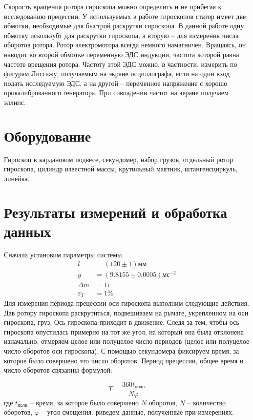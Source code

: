 \documentclass[a4paper, 12pt]{article}
\begin{document}
	Скорость вращения ротора гироскопа можно определить и не прибегая к исследованию прецессии. У используемых в работе гироскопов статор имеет две обмотки, необходимые для быстрой раскрутки гироскопа. В данной работе одну обмотку искользубт для раскрутки гироскопа, а вторую -- для измерения числа оборотов ротора. Ротор электромотора всегда немного намагничен. Вращаясь, он наводит во второй обмотке переменную ЭДС индукции, частота которой равна частоте врещения ротора. Частоту этой ЭДС можно, в частности, измерить по фигурам Лиссажу, получаемым на экране осциллографа, если на один вход подать исследуемую ЭДС, а на другой -- переменное напряжение с хорошо прокалиброванного генератора. При совпадении частот на эеране получаем эллипс.

    \section{Оборудование}

	Гироскоп в кардановом подвесе, секундомер, набор грузов, отдельный ротор гироскопа, цилиндр известной массы, крутильный маятник, штангенсциркуль, линейка.
    \section{Результаты измерений и обработка данных}
    
 Сначала установим параметры системы.
    \begin{align*}
     l&=(120\pm1)мм\\
     g&=(9.8155\pm0.0005)мс^{-2}\\
     \Delta m &= 1г\\
     \varepsilon_T &= 1\%
    \end{align*}
    Для измерения периода прецессии оси гироскопа выполним следующие действия. Дав ротору гироскопа раскрутиться, подвешиваем на рычаге, укрепленном на оси гироскопа, груз. Ось гироскопа приходит в движение. Следя за тем, чтобы ось гироскопа опустилась примерно на тот же угол, на который она была отклонена изначально, отмеряем целое или полуцелое число периодов (целое или полуцелое число оборотов оси гироскопа). С помощью секундомера фиксируем время, за которое было совершено это число оборотов. Период прецессии, общее время и число оборотов связанны формулой:
	
	\begin{equation}
		T = \frac{360t_{\text{полн}}}{N\varphi}
		\label{eq:period_equation}
	\end{equation}
где $t_{\text{полн}}$ -- время, за которое было совершено $N$ оборотов, $N$ -- количество оборотов, $\varphi$ -- угол смещения.
риведем данные, полученные при измерениях.
\end{document}
